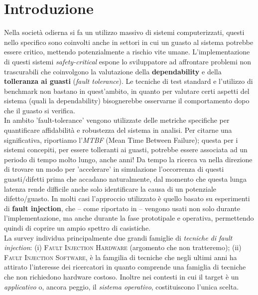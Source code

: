 \section{Introduzione}
Nella società odierna si fa un utilizzo massivo di sistemi computerizzati, questi nello specifico sono coinvolti anche in settori in cui un guasto al sistema potrebbe essere critico, mettendo potenzialmente a rischio vite umane. L'implementazione di questi sistemi \textit{safety-critical} espone lo sviluppatore ad affrontare problemi non trascurabili che coinvolgono la valutazione della \textbf{dependability} \cite{noauthor_dependability_2024} e della \textbf{tolleranza ai guasti} (\textit{fault tolerance}). Le tecniche di test standard e l'utilizzo di benchmark non bastano in quest'ambito, in quanto per valutare certi aspetti del sistema (quali la dependability) bisognerebbe osservarne il comportamento dopo che il guasto si verifica. \\
In ambito 'fault-tolerance' vengono utilizzate delle metriche specifiche per quantificare affidabilità e robustezza del sistema in analisi. Per citarne una significativa, riportiamo l'\textit{MTBF} (Mean Time Between Failure); questa per i sistemi concepiti, per essere tolleranti ai guasti, potrebbe essere associata ad un periodo di tempo molto lungo, anche anni! Da tempo la ricerca va nella direzione di trovare un modo per 'accelerare' in simulazione l'occorrenza di questi guasti/difetti prima che accadano naturalmente, dal momento che questa lunga latenza rende difficile anche solo identificare la causa di un potenziale difetto/guasto. In molti casi l'approccio utilizzato è quello basato su esperimenti di \textbf{fault injection}, che -- come riportato in \cite{depend} -- vengono usati non solo durante l'implementazione, ma anche durante la fase prototipale e operativa, permettendo quindi di coprire un ampio spettro di casistiche.\\
La survey \cite{hsueh1997fault} individua principalmente due grandi famiglie di \textit{tecniche di fault injection}:
(i) \textsc{Fault Injection Hardware} (argomento che non tratteremo); (ii) \textsc{Fault Injection Software}, è la famgilia  di tecniche che negli ultimi anni ha attirato l'interesse dei ricercatori in quanto comprende una famiglia di tecniche che non richiedono hardware costoso. Inoltre nei contesti in cui il target è un \textit{applicativo} o, ancora peggio, il \textit{sistema operativo}, costituiscono l'unica scelta.

